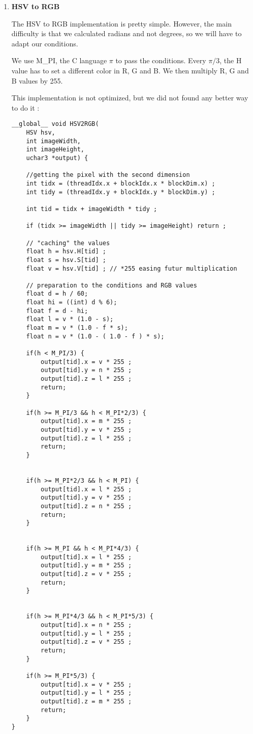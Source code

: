 \documentclass{article}
\begin{document}
\begin{enumerate}
    However, even though this method is more elegant, this particular implementation does not get the good results. 
    
    \item \textbf{HSV to RGB}
    
    The HSV to RGB implementation is pretty simple. However, the main difficulty is that we calculated radians and not degrees, so we will have to adapt our conditions. 
    
    We use M\_PI, the C language $\pi$ to pass the conditions. Every $\pi/3$, the H value has to set a different color in R, G and B. We then multiply R, G and B values by 255. 
    
    This implementation is not optimized, but we did not found any better way to do it : 
    
    \begin{verbatim}
__global__ void HSV2RGB(
    HSV hsv, 
    int imageWidth, 
    int imageHeight, 
    uchar3 *output) {
    
	//getting the pixel with the second dimension
	int tidx = (threadIdx.x + blockIdx.x * blockDim.x) ; 
	int tidy = (threadIdx.y + blockIdx.y * blockDim.y) ;

	int tid = tidx + imageWidth * tidy ;
	
	if (tidx >= imageWidth || tidy >= imageHeight) return ;
	
	// "caching" the values
	float h = hsv.H[tid] ;
	float s = hsv.S[tid] ;
	float v = hsv.V[tid] ; // *255 easing futur multiplication 
	
	// preparation to the conditions and RGB values
	float d = h / 60;
	float hi = ((int) d % 6); 
	float f = d - hi;
	float l = v * (1.0 - s);
	float m = v * (1.0 - f * s);
	float n = v * (1.0 - ( 1.0 - f ) * s);
	
	if(h < M_PI/3) {     
	    output[tid].x = v * 255 ;
	    output[tid].y = n * 255 ;
	    output[tid].z = l * 255 ;
	    return;   
	}
   
	if(h >= M_PI/3 && h < M_PI*2/3) {     
	    output[tid].x = m * 255 ;
	    output[tid].y = v * 255 ;
	    output[tid].z = l * 255 ;
	    return;
	}
   
   
	if(h >= M_PI*2/3 && h < M_PI) {     
	    output[tid].x = l * 255 ;
	    output[tid].y = v * 255 ;
	    output[tid].z = n * 255 ;
	    return;
	}
   
   
	if(h >= M_PI && h < M_PI*4/3) {     
	    output[tid].x = l * 255 ;
	    output[tid].y = m * 255 ;
	    output[tid].z = v * 255 ;
	    return;
	}
   
   
	if(h >= M_PI*4/3 && h < M_PI*5/3) {     
	    output[tid].x = n * 255 ;
	    output[tid].y = l * 255 ;
	    output[tid].z = v * 255 ;
	    return;
	}
       
	if(h >= M_PI*5/3) {
	    output[tid].x = v * 255 ;
	    output[tid].y = l * 255 ;
	    output[tid].z = m * 255 ;
	    return;
	}
}
    \end{verbatim}
    
    \end{enumerate}
\end{document}
